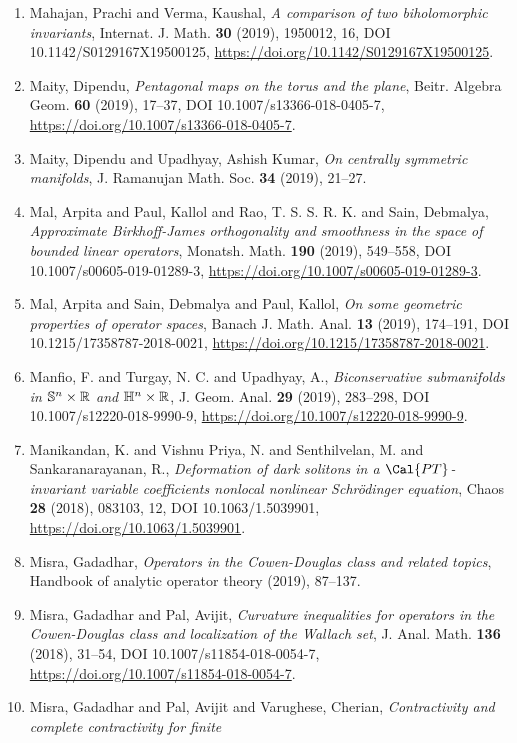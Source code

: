 \begin{enumerate}
\item Mahajan, Prachi and Verma, Kaushal, {\em A comparison of two biholomorphic invariants}, Internat. J. Math. {\bf 30} (2019), 1950012, 16, DOI 10.1142/S0129167X19500125, \url{https://doi.org/10.1142/S0129167X19500125}.
\item Maity, Dipendu, {\em Pentagonal maps on the torus and the plane}, Beitr. Algebra Geom. {\bf 60} (2019), 17--37, DOI 10.1007/s13366-018-0405-7, \url{https://doi.org/10.1007/s13366-018-0405-7}.
\item Maity, Dipendu and Upadhyay, Ashish Kumar, {\em On centrally symmetric manifolds}, J. Ramanujan Math. Soc. {\bf 34} (2019), 21--27.
\item Mal, Arpita and Paul, Kallol and Rao, T. S. S. R. K. and Sain,
Debmalya, {\em Approximate {B}irkhoff-{J}ames orthogonality and smoothness in
the space of bounded linear operators}, Monatsh. Math. {\bf 190} (2019), 549--558, DOI 10.1007/s00605-019-01289-3, \url{https://doi.org/10.1007/s00605-019-01289-3}.
\item Mal, Arpita and Sain, Debmalya and Paul, Kallol, {\em On some geometric properties of operator spaces}, Banach J. Math. Anal. {\bf 13} (2019), 174--191, DOI 10.1215/17358787-2018-0021, \url{https://doi.org/10.1215/17358787-2018-0021}.
\item Manfio, F. and Turgay, N. C. and Upadhyay, A., {\em Biconservative submanifolds in {$\Bbb{S}^n\times\Bbb{R}$} and
{$\Bbb{H}^n\times\Bbb{R}$}}, J. Geom. Anal. {\bf 29} (2019), 283--298, DOI 10.1007/s12220-018-9990-9, \url{https://doi.org/10.1007/s12220-018-9990-9}.
\item Manikandan, K. and Vishnu Priya, N. and Senthilvelan, M. and
Sankaranarayanan, R., {\em Deformation of dark solitons in a {$\Cal{PT}$}-invariant
variable coefficients nonlocal nonlinear {S}chr\"{o}dinger
equation}, Chaos {\bf 28} (2018), 083103, 12, DOI 10.1063/1.5039901, \url{https://doi.org/10.1063/1.5039901}.
\item Misra, Gadadhar, {\em Operators in the {C}owen-{D}ouglas class and related topics}, Handbook of analytic operator theory {\bf } (2019), 87--137.
\item Misra, Gadadhar and Pal, Avijit, {\em Curvature inequalities for operators in the {C}owen-{D}ouglas
class and localization of the {W}allach set}, J. Anal. Math. {\bf 136} (2018), 31--54, DOI 10.1007/s11854-018-0054-7, \url{https://doi.org/10.1007/s11854-018-0054-7}.
\item Misra, Gadadhar and Pal, Avijit and Varughese, Cherian, {\em Contractivity and complete contractivity for finite
}
\end{enumerate}
